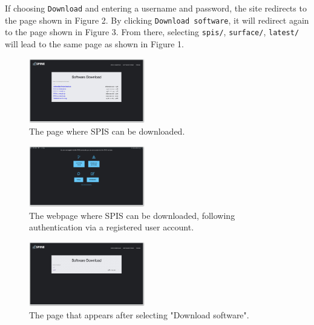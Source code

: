 \documentclass[a4paper, 11pt]{article}
\begin{document}
If choosing \verb|Download| and entering a username and password, the site redirects to the page shown in Figure 2. By clicking \verb|Download software|, it will redirect again to the page shown in Figure 3. From there, selecting \verb|spis/|, \verb|surface/|, \verb|latest/| will lead to the same page as shown in Figure 1.

\begin{figure}[!ht]
    \centering
    \includegraphics[width=0.45\textwidth]{fig1.jpg}
    \caption{The page where SPIS can be downloaded.}
\end{figure}

\begin{figure}[!ht]
    \centering
    \includegraphics[width=0.45\textwidth]{fig2.jpg}
    \caption{The webpage where SPIS can be downloaded, following authentication via a registered user account.}
\end{figure}

\begin{figure}[!ht]
    \centering
    \includegraphics[width=0.45\textwidth]{fig3.jpg}
    \caption{The page that appears after selecting "Download software".}
\end{figure}
\end{document}

